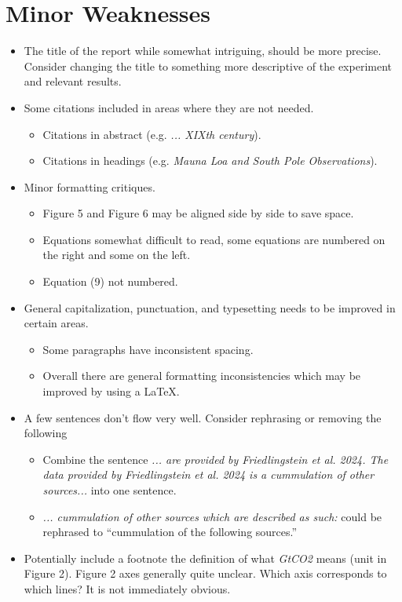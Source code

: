 \documentclass[%
 aip,
cp,  %
 amsmath,amssymb,
 reprint,%
nofootinbib
]{revtex4-2}
\begin{document}
\section{Minor Weaknesses}
\begin{itemize}
    \item The title of the report while somewhat intriguing, should be more precise. Consider changing the title to something more descriptive of the experiment and relevant results.
    \item Some citations included in areas where they are not needed.
    \begin{itemize}
        \item Citations in abstract (e.g. \textit{... XIXth century}).
        \item Citations in headings (e.g. \textit{Mauna Loa and South Pole Observations}).
    \end{itemize}
    \item Minor formatting critiques.
    \begin{itemize}
        \item Figure 5 and Figure 6 may be aligned side by side to save space.
        \item Equations somewhat difficult to read, some equations are numbered on the right and some on the left.
        \item Equation (9) not numbered.
    \end{itemize}
    
    \item General capitalization, punctuation, and typesetting needs to be improved in certain areas.
    \begin{itemize}
        \item Some paragraphs have inconsistent spacing.
        \item Overall there are general formatting inconsistencies which may be improved by using a \LaTeX.
    \end{itemize}
    \item A few sentences don't flow very well. Consider rephrasing or removing the following
    \begin{itemize}
        \item Combine the sentence \textit{... are provided by Friedlingstein et al. 2024. The data provided by Friedlingstein et al. 2024 is a cummulation of other sources...} into one sentence. 
        \item \textit{... cummulation of other sources which are described as such:} could be rephrased to ``cummulation of the following sources.''
    \end{itemize}
    \item Potentially include a footnote the definition of what \textit{GtCO2} means (unit in Figure 2). Figure 2 axes generally quite unclear. Which axis corresponds to which lines? It is not immediately obvious.
    

\end{itemize}
\end{document}
